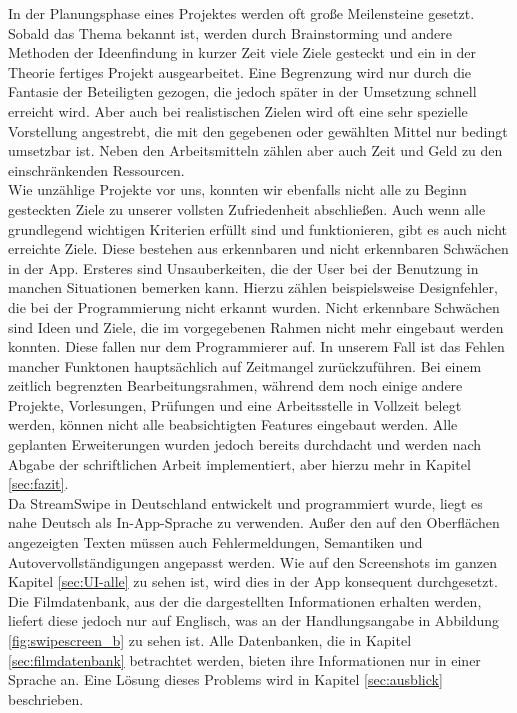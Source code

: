In der Planungsphase eines Projektes werden oft große Meilensteine gesetzt. Sobald das Thema bekannt ist, werden durch Brainstorming und andere Methoden der Ideenfindung in kurzer Zeit viele Ziele gesteckt und ein in der Theorie fertiges Projekt ausgearbeitet. Eine Begrenzung wird nur durch die Fantasie der Beteiligten gezogen, die jedoch später in der Umsetzung schnell erreicht wird. Aber auch bei realistischen Zielen wird oft eine sehr spezielle Vorstellung angestrebt, die mit den gegebenen oder gewählten Mittel nur bedingt umsetzbar ist. Neben den Arbeitsmitteln zählen aber auch Zeit und Geld zu den einschränkenden Ressourcen.\\

\noindent
Wie unzählige Projekte vor uns, konnten wir ebenfalls nicht alle zu Beginn gesteckten Ziele zu unserer vollsten Zufriedenheit abschließen. Auch wenn alle grundlegend wichtigen Kriterien erfüllt sind und funktionieren, gibt es auch nicht erreichte Ziele. Diese bestehen aus erkennbaren und nicht erkennbaren Schwächen in der App. Ersteres sind Unsauberkeiten, die der User bei der Benutzung in manchen Situationen bemerken kann. Hierzu zählen beispielsweise Designfehler, die bei der Programmierung nicht erkannt wurden. Nicht erkennbare Schwächen sind Ideen und Ziele, die im vorgegebenen Rahmen nicht mehr eingebaut werden konnten. Diese fallen nur dem Programmierer auf. In unserem Fall ist das Fehlen mancher Funktonen hauptsächlich auf Zeitmangel zurückzuführen. Bei einem zeitlich begrenzten Bearbeitungsrahmen, während dem noch einige andere Projekte, Vorlesungen, Prüfungen und eine Arbeitsstelle in Vollzeit belegt werden, können nicht alle beabsichtigten Features eingebaut werden. Alle geplanten Erweiterungen wurden jedoch bereits durchdacht und werden nach Abgabe der schriftlichen Arbeit implementiert, aber hierzu mehr in Kapitel \ref{sec:fazit}.\\
Da StreamSwipe in Deutschland entwickelt und programmiert wurde, liegt es nahe Deutsch als In-App-Sprache zu verwenden. Außer den auf den Oberflächen angezeigten Texten müssen auch Fehlermeldungen, Semantiken und Autovervollständigungen angepasst werden. Wie auf den Screenshots im ganzen Kapitel \ref{sec:UI-alle} zu sehen ist, wird dies in der App konsequent durchgesetzt. Die Filmdatenbank, aus der die dargestellten Informationen erhalten werden, liefert diese jedoch nur auf Englisch, was an der Handlungsangabe in Abbildung  \ref{fig:swipescreen_b} zu sehen ist. Alle Datenbanken, die in Kapitel  \ref{sec:filmdatenbank} betrachtet werden, bieten ihre Informationen nur in einer Sprache an. Eine Lösung dieses Problems wird in Kapitel \ref{sec:ausblick} beschrieben.\\

